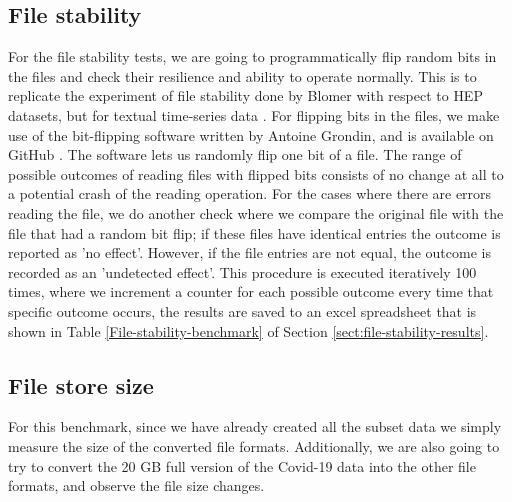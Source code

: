 \subsection{File stability}
\label{File-stability-method}
For the file stability tests, we are going to programmatically flip random bits in the files and check their resilience and ability to operate normally. This is to replicate the experiment of file stability done by Blomer with respect to \gls{HEP} datasets, but for textual time-series data \cite{blomer_quantitative_2018}. For flipping bits in the files, we make use of the bit-flipping software written by Antoine Grondin, and is available on GitHub \cite{grondin_bitflip_2022}. The software lets us randomly flip one bit of a file. The range of possible outcomes of reading files with flipped bits consists of no change at all to a potential crash of the reading operation. For the cases where there are errors reading the file, we do another check where we compare the original file with the file that had a random bit flip; if these files have identical entries the outcome is reported as 'no effect'. However, if the file entries are not equal, the outcome is recorded as an 'undetected effect'. This procedure is executed iteratively 100 times, where we increment a counter for each possible outcome every time that specific outcome occurs, the results are saved to an excel spreadsheet that is shown in Table \ref{File-stability-benchmark} of Section \ref{sect:file-stability-results}.

\subsection{File store size}
For this benchmark, since we have already created all the subset data we simply measure the size of the converted file formats. Additionally, we are also going to try to convert the 20 GB full version of the Covid-19 data into the other file formats, and observe the file size changes.